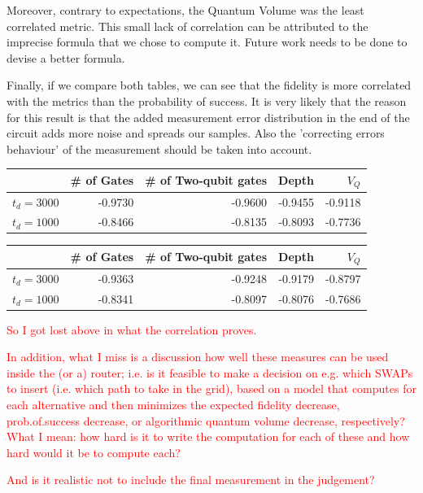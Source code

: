 Moreover, contrary to expectations, the Quantum Volume was the least correlated metric.
This small lack of correlation can be attributed to the imprecise formula that we chose to compute it.
Future work needs to be done to devise a better formula.

Finally, if we compare both tables, we can see that the fidelity is more correlated with the metrics than the probability of success.
It is very likely that the reason for this result is that the added measurement error distribution in the end of the circuit adds more noise and spreads our samples.
Also the 'correcting errors behaviour' of the measurement should be taken into account.

\begin{center}
\begin{tabular}{lrrrr}
\hline
 & \# of Gates & \# of Two-qubit gates & Depth & \(V_Q\)\\
\hline
\(t_d = 3000\) & -0.9730 & -0.9600 & -0.9455 & -0.9118\\
\(t_d = 1000\) & -0.8466 & -0.8135 & -0.8093 & -0.7736\\
\hline
\end{tabular}
\end{center}

\begin{center}
\begin{tabular}{lrrrr}
\hline
 & \# of Gates & \# of Two-qubit gates & Depth & \(V_Q\)\\
\hline
\(t_d = 3000\) & -0.9363 & -0.9248 & -0.9179 & -0.8797\\
\(t_d = 1000\) & -0.8341 & -0.8097 & -0.8076 & -0.7686\\
\hline
\end{tabular}
\end{center}

\textcolor{red}{So I got lost above in what the correlation proves.}

\textcolor{red}{In addition, what I miss is a discussion how well these measures can be used inside the (or a) router; i.e. is it feasible to make a decision on e.g. which SWAPs to insert (i.e. which path to take in the grid), based on a model that computes for each alternative and then minimizes the expected fidelity decrease, prob.of.success decrease, or algorithmic quantum volume decrease, respectively? What I mean: how hard is it to write the computation for each of these and how hard would it be to compute each?}

\textcolor{red}{And is it realistic not to include the final measurement in the judgement?}